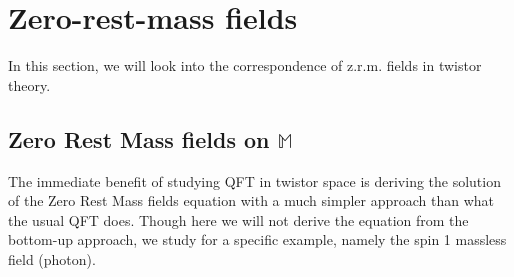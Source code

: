 \documentclass{article}
\begin{document}
\section{Zero-rest-mass fields}%
  \label{sec:Application}
  In this section, we will look into the correspondence of z.r.m. fields
  in twistor
  theory.

 \subsection{Zero Rest Mass fields on $ \mathbb{M}$}%
  \label{sub: Zero Rest Mass fields on Minkowski}
  The immediate benefit of studying QFT in twistor space is deriving
  the solution of the Zero Rest Mass fields equation with a much simpler
  approach than what the usual QFT does. Though here we will not derive the
  equation from the bottom-up approach, we study for a specific
  example, namely the spin 1 massless field (photon). 
\end{document}
